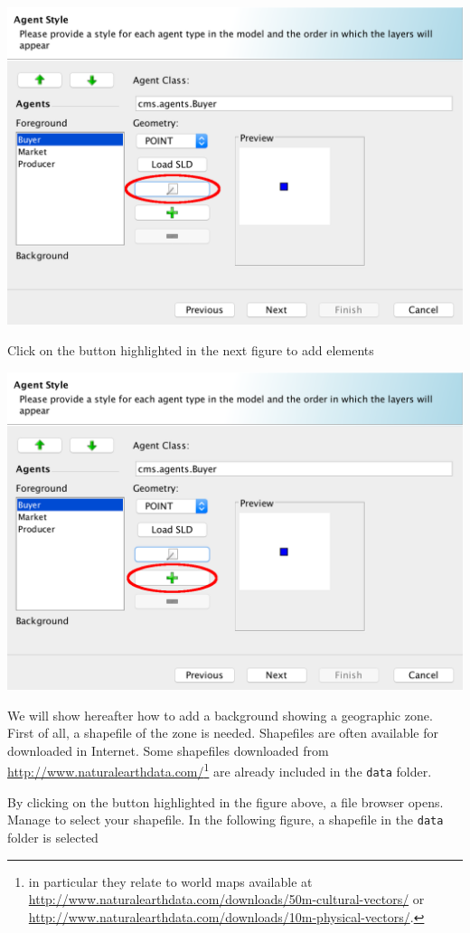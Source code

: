 \documentclass{article}
\begin{document}
\includegraphics[scale=0.35]{fig_cms_rs_gis4a}

Click on the button highlighted in the next figure to add elements

\includegraphics[scale=0.35]{fig_cms_rs_gis4b}

We will show hereafter how to add a background showing a geographic zone. First of all, a shapefile of the zone is needed.  
Shapefiles are often available for downloaded in Internet. Some shapefiles downloaded from \url{http://www.naturalearthdata.com/}\footnote{
	in particular they relate to world maps available at \url{http://www.naturalearthdata.com/downloads/50m-cultural-vectors/} or \url{http://www.naturalearthdata.com/downloads/10m-physical-vectors/}.} are already included in the \verb+data+ folder.

By clicking on the button highlighted in the figure above, a file browser opens. Manage to select your shapefile. In the following figure, a shapefile in the \verb+data+ folder is selected
\end{document}
